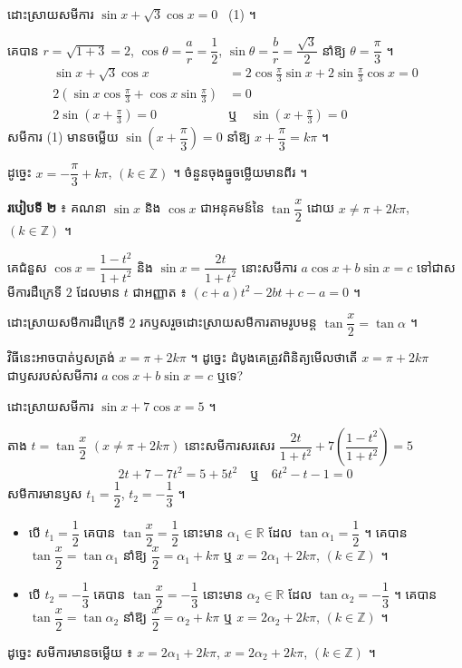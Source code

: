 \begin{example}[ឧទាហរណ៍ ១]
ដោះស្រាយសមីការ $\sin x + \sqrt{3}\cos x = 0$ \ (1) ។

គេបាន $r = \sqrt{1 + 3} = 2$, $\cos\theta = \dfrac{a}{r} = \dfrac{1}{2}$, $\sin\theta = \dfrac{b}{r} = \dfrac{\sqrt{3}}{2}$ នាំឱ្យ $\theta = \dfrac{\pi}{3}$ ។
\[
\begin{aligned}
\sin x + \sqrt{3}\cos x &= 2\cos\frac{\pi}{3}\sin x + 2\sin\frac{\pi}{3}\cos x = 0\\
2\left(\sin x\cos\frac{\pi}{3} + \cos x\sin\frac{\pi}{3}\right) &= 0\\
2\sin\left(x + \frac{\pi}{3}\right) = 0 \quad &\text{ឬ} \quad \sin\left(x + \frac{\pi}{3}\right) = 0
\end{aligned}
\]
សមីការ (1) មានចម្លើយ $\sin\left(x + \dfrac{\pi}{3}\right) = 0$ នាំឱ្យ $x + \dfrac{\pi}{3} = k\pi$ ។

ដូច្នេះ $x = -\dfrac{\pi}{3} + k\pi$, $(k \in \mathbb{Z})$ ។ ចំនួនចុងធ្នូចម្លើយមានពីរ ។
\end{example}

\textbf{របៀបទី ២} ៖ គណនា $\sin x$ និង $\cos x$ ជាអនុគមន៍នៃ $\tan\dfrac{x}{2}$ ដោយ $x \ne \pi + 2k\pi$, $(k \in \mathbb{Z})$ ។

គេជំនួស $\cos x = \dfrac{1 - t^2}{1 + t^2}$ និង $\sin x = \dfrac{2t}{1 + t^2}$ នោះសមីការ $a\cos x + b\sin x = c$ ទៅជាសមីការដឺក្រេទី $2$ ដែលមាន $t$ ជាអញ្ញាត ៖ $(c + a)t^2 - 2bt + c - a = 0$ ។

ដោះស្រាយសមីការដឺក្រេទី $2$ រកឫសរួចដោះស្រាយសមីការតាមរូបមន្ត $\tan\dfrac{x}{2} = \tan\alpha$ ។

\begin{note}[សម្គាល់]
វិធីនេះអាចបាត់ឫសត្រង់ $x = \pi + 2k\pi$ ។ ដូច្នេះ ដំបូងគេត្រូវពិនិត្យមើលថាតើ $x = \pi + 2k\pi$ ជាឫសរបស់សមីការ $a\cos x + b\sin x = c$ ឬទេ?
\end{note}

\begin{example}[ឧទាហរណ៍ ២]
ដោះស្រាយសមីការ $\sin x + 7\cos x = 5$ ។

តាង $t = \tan\dfrac{x}{2}$ $(x \ne \pi + 2k\pi)$ នោះសមីការសរសេរ $\dfrac{2t}{1 + t^2} + 7\left(\dfrac{1 - t^2}{1 + t^2}\right) = 5$
\[ 2t + 7 - 7t^2 = 5 + 5t^2 \quad \text{ឬ} \quad 6t^2 - t - 1 = 0 \]
សមីការមានឫស $t_1 = \dfrac{1}{2}$, $t_2 = -\dfrac{1}{3}$ ។
\begin{itemize}
  \item បើ $t_1 = \dfrac{1}{2}$ គេបាន $\tan\dfrac{x}{2} = \dfrac{1}{2}$ នោះមាន $\alpha_1 \in \mathbb{R}$ ដែល $\tan\alpha_1 = \dfrac{1}{2}$ ។ គេបាន $\tan\dfrac{x}{2} = \tan\alpha_1$ នាំឱ្យ $\dfrac{x}{2} = \alpha_1 + k\pi$ ឬ $x = 2\alpha_1 + 2k\pi$, $(k \in \mathbb{Z})$ ។
  \item បើ $t_2 = -\dfrac{1}{3}$ គេបាន $\tan\dfrac{x}{2} = -\dfrac{1}{3}$ នោះមាន $\alpha_2 \in \mathbb{R}$ ដែល $\tan\alpha_2 = -\dfrac{1}{3}$ ។ គេបាន $\tan\dfrac{x}{2} = \tan\alpha_2$ នាំឱ្យ $\dfrac{x}{2} = \alpha_2 + k\pi$ ឬ $x = 2\alpha_2 + 2k\pi$, $(k \in \mathbb{Z})$ ។
\end{itemize}
ដូច្នេះ សមីការមានចម្លើយ ៖ $x = 2\alpha_1 + 2k\pi$, $x = 2\alpha_2 + 2k\pi$, $(k \in \mathbb{Z})$ ។
\end{example}

